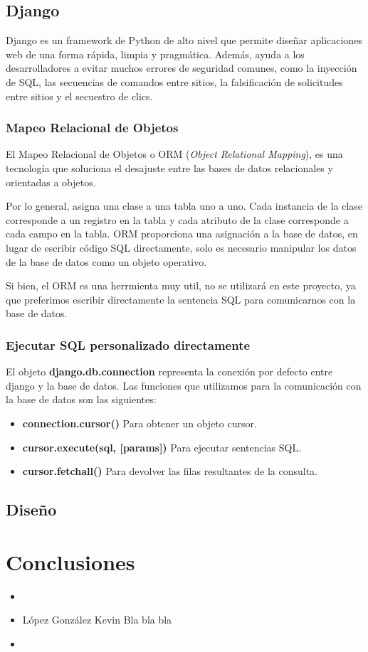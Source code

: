 \documentclass[12pt,letterpaper]{article}
\begin{document}
		\subsection{Django}
		Django es un framework de Python de alto nivel que permite diseñar aplicaciones web de una forma rápida, limpia y pragmática. Además, ayuda a los desarrolladores a evitar muchos errores de seguridad comunes, como la inyección de SQL, las secuencias de comandos entre sitios, la falsificación de solicitudes entre sitios y el secuestro de clics.
			
			\subsubsection{Mapeo Relacional de Objetos}
			El Mapeo Relacional de Objetos o ORM (\textit{Object Relational Mapping}), es una tecnología que soluciona el desajuste entre las bases de datos relacionales y orientadas a objetos.\par 
			Por lo general, asigna una clase a una tabla uno a uno. Cada instancia de la clase corresponde a un registro en la tabla y cada atributo de la clase corresponde a cada campo en la tabla. ORM proporciona una asignación a la base de datos, en lugar de escribir código SQL directamente, solo es necesario manipular los datos de la base de datos como un objeto operativo.\par 
			Si bien, el ORM es una herrmienta muy util, no se utilizará en este proyecto, ya que preferimos escribir directamente la sentencia SQL para comunicarnos con la base de datos.
			
			\subsubsection{Ejecutar SQL personalizado directamente}
			El objeto \textbf{django.db.connection} representa la conexión por defecto entre django y la base de datos. Las funciones que utilizamos para la comunicación con la base de datos son las siguientes:
			\begin{itemize}
				\item \textbf{connection.cursor()}
					\subitem Para obtener un objeto cursor.
					
				\item \textbf{cursor.execute(sql, [params])}
					\subitem Para ejecutar sentencias SQL.
					
				\item \textbf{cursor.fetchall()}
					\subitem Para devolver las filas resultantes de la consulta.
			\end{itemize}
		
		\subsection{Diseño}
		
	
	\section{Conclusiones}
		\begin{itemize}
			\item 
				\subitem 
				
			\item López González Kevin
				\subitem Bla bla bla

			\item 
				\subitem
		\end{itemize}

	
\end{document}
